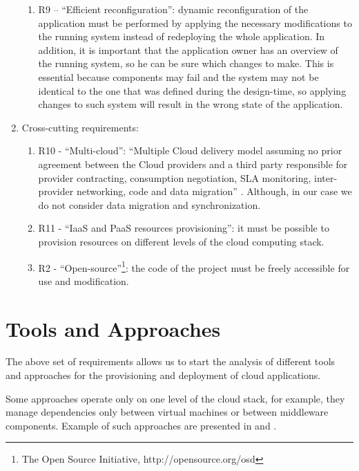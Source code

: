 \begin{enumerate}
\begin{enumerate}
\item  R9 -- ``Efficient reconfiguration'': dynamic reconfiguration of the application must be performed by applying the necessary modifications to the running system instead of redeploying the whole application. In addition, it is important that the application owner has an overview of the running system, so he can be sure which changes to make. This is essential because components may fail and the system may not be identical to the one that was defined during the design-time, so applying changes to such system will result in the wrong state of the application.
\end{enumerate}

\item  Cross-cutting requirements:

\begin{enumerate}
\item  R10 - ``Multi-cloud'': ``Multiple Cloud delivery model assuming no prior agreement between the Cloud providers and a third party responsible for provider contracting, consumption negotiation, SLA monitoring, inter-provider networking, code and data migration'' \cite{petcu2014consuming}. Although, in our case we do not consider data migration and synchronization.

\item  R11 - ``IaaS and PaaS resources provisioning'': it must be possible to provision resources on different levels of the cloud computing stack.

\item  R2 - ``Open-source''\footnote{ The Open Source Initiative, $  $http://opensource.org/osd}: the code of the project must be freely accessible for use and modification.
\end{enumerate}
\end{enumerate}


\section{Tools and Approaches}

\noindent The above set of requirements allows us to start the analysis of different tools and approaches for the provisioning and deployment of cloud applications.

\noindent Some approaches operate only on one level of the cloud stack, for example, they manage dependencies only between virtual machines or between middleware components. Example of such approaches are presented in \cite{juniormodel, konstantinou2009architecture} and \cite{juve2011automating}. 

